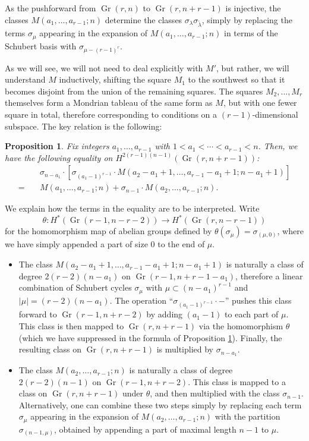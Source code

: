 \documentclass[11pt]{article}
\newtheorem{prop}[theo]{Proposition}
\theoremstyle{definition}
\numberwithin{equation}{section}
\DeclareMathOperator{\Gr}{Gr}
\begin{document}
As the pushforward from $\Gr(r,n)$ to $\Gr(r,n+r-1)$ is injective, the classes $M(a_1,\ldots,a_{r-1};n)$ determine the classes $\sigma_{\lambda}\sigma_{\widetilde{\lambda}}$, simply by replacing the terms $\sigma_\mu$ appearing in the expansion of $M(a_1,\ldots,a_{r-1};n)$ in terms of the Schubert basis with $\sigma_{\mu-(r-1)^r}$.

As we will see, we will not need to deal explicitly with $M'$, but rather, we will understand $M$ inductively, shifting the square $M_1$ to the southwest so that it becomes disjoint from the union of the remaining squares. The squares $M_2,\ldots,M_r$ themselves form a Mondrian tableau of the same form as $M$, but with one fewer square in total, therefore corresponding to conditions on a $(r-1)$-dimensional subspace. The key relation is the following:

\begin{prop}\label{one_step}
Fix integers $a_1,\ldots,a_{r-1}$ with $1<a_1<\cdots<a_{r-1}<n$. Then, we have the following equality on $H^{2(r-1)(n-1)}(\Gr(r,n+r-1))$:
\begin{align*}
&\sigma_{n-a_1}\cdot [\sigma_{(a_1-1)^{r-1}}\cdot M(a_2-a_1+1,\ldots,a_{r-1}-a_1+1;n-a_1+1)]\\
=\quad &M(a_1,\ldots,a_{r-1};n)+\sigma_{n-1}\cdot M(a_2,\ldots,a_{r-1};n).
\end{align*}
\end{prop}

We explain how the terms in the equality are to be interpreted. Write 
\begin{equation*}
\theta:H^{*}(\Gr(r-1,n-r-2))\to H^{*}(\Gr(r,n-r-1))
\end{equation*}
for the homomorphism map of abelian groups defined by $\theta(\sigma_\mu)=\sigma_{(\mu,0)}$, where we have simply appended a part of size 0 to the end of $\mu$.
\begin{itemize}
\item The class $M(a_2-a_1+1,\ldots,a_{r-1}-a_1+1;n-a_1+1)$ is naturally a class of degree $2(r-2)(n-a_1)$ on $\Gr(r-1,n+r-1-a_1)$, therefore a linear combination of Schubert cycles $\sigma_\mu$ with $\mu\subset(n-a_1)^{r-1}$ and $|\mu|=(r-2)(n-a_1)$. The operation ``$\sigma_{(a_1-1)^{r-1}}\cdot-$'' pushes this class forward to $\Gr(r-1,n+r-2)$ by adding $(a_1-1)$ to each part of $\mu$. This class is then mapped to $\Gr(r,n+r-1)$ via the homomorphism $\theta$ (which we have suppressed in the formula of Proposition \ref{one_step}). Finally, the resulting class on $\Gr(r,n+r-1)$ is multiplied by $\sigma_{n-a_1}$.

\item The class $M(a_2,\ldots,a_{r-1};n)$ is naturally a class of degree $2(r-2)(n-1)$ on $\Gr(r-1,n+r-2)$. This class is mapped to a class on $\Gr(r,n+r-1)$ under $\theta$, and then multiplied with the class $\sigma_{n-1}$. Alternatively, one can combine these two steps simply by replacing each term $\sigma_{\mu}$ appearing in the expansion of $M(a_2,\ldots,a_{r-1};n)$ with the partition $\sigma_{(n-1,\mu)}$, obtained by appending a part of maximal length $n-1$ to $\mu$.
\end{itemize}
\end{document}

